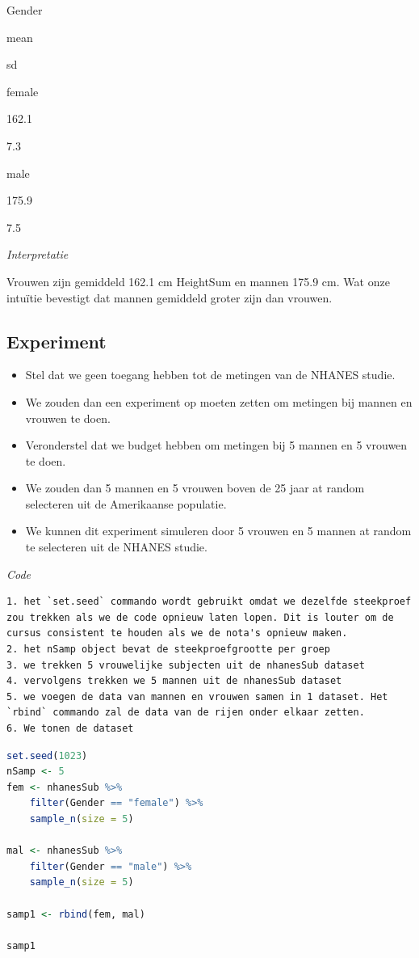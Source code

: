 \documentclass[
  12pt,dutch,coursenotes]{book}
\theoremstyle{definition}
\theoremstyle{definition}
\theoremstyle{definition}
\theoremstyle{definition}
\theoremstyle{remark}
\begin{document}
Gender

mean

sd

female

162.1

7.3

male

175.9

7.5

\emph{Interpretatie}

Vrouwen zijn gemiddeld 162.1 cm HeightSum en mannen 175.9 cm.
Wat onze intuïtie bevestigt dat mannen gemiddeld groter zijn dan vrouwen.

\hypertarget{experiment}{%
\subsection{Experiment}\label{experiment}}

\begin{itemize}
\item
  Stel dat we geen toegang hebben tot de metingen van de NHANES studie.
\item
  We zouden dan een experiment op moeten zetten om metingen bij mannen en vrouwen te doen.
\item
  Veronderstel dat we budget hebben om metingen bij 5 mannen en 5 vrouwen te doen.
\item
  We zouden dan 5 mannen en 5 vrouwen boven de 25 jaar at random selecteren uit de Amerikaanse populatie.
\item
  We kunnen dit experiment simuleren door 5 vrouwen en 5 mannen at random te selecteren uit de NHANES studie.
\end{itemize}

\emph{Code}

\begin{lstlisting}
1. het `set.seed` commando wordt gebruikt omdat we dezelfde steekproef zou trekken als we de code opnieuw laten lopen. Dit is louter om de cursus consistent te houden als we de nota's opnieuw maken.
2. het nSamp object bevat de steekproefgrootte per groep
3. we trekken 5 vrouwelijke subjecten uit de nhanesSub dataset
4. vervolgens trekken we 5 mannen uit de nhanesSub dataset
5. we voegen de data van mannen en vrouwen samen in 1 dataset. Het `rbind` commando zal de data van de rijen onder elkaar zetten.
6. We tonen de dataset
\end{lstlisting}

\begin{lstlisting}[language=R]
set.seed(1023)
nSamp <- 5
fem <- nhanesSub %>%
    filter(Gender == "female") %>%
    sample_n(size = 5)

mal <- nhanesSub %>%
    filter(Gender == "male") %>%
    sample_n(size = 5)

samp1 <- rbind(fem, mal)

samp1
\end{lstlisting}
\end{document}
